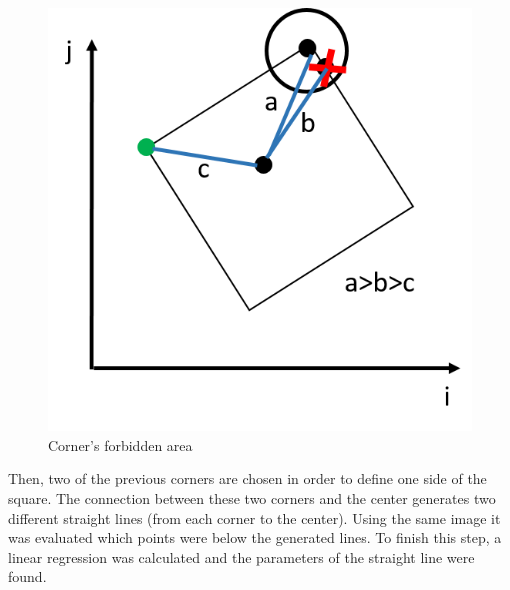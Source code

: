 \begin{figure}[H]
\centering
\includegraphics[scale=0.5]{figures/rotation6.png}
\caption{Corner's forbidden area}
\label{fig:corner}
\end{figure}

Then, two of the previous corners are chosen in order to define one side of the square. The connection between these two corners and the center generates two different straight lines (from each corner to the center). Using the same image it was evaluated which points were below the generated lines. To finish this step, a linear regression was calculated and the parameters of the straight line were found.

